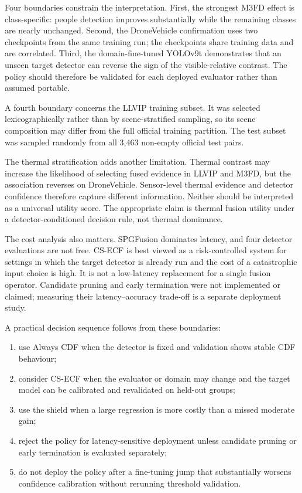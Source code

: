 \documentclass[preprint,11pt]{elsarticle}
\begin{document}
Four boundaries constrain the interpretation. First, the strongest M3FD effect
is class-specific: people detection improves substantially while the remaining
classes are nearly unchanged. Second, the DroneVehicle confirmation uses two
checkpoints from the same training run; the checkpoints share training data and
are correlated. Third, the domain-fine-tuned YOLOv9t demonstrates that an
unseen target detector can reverse the sign of the visible-relative contrast.
The policy should therefore be validated for each deployed evaluator rather
than assumed portable.

A fourth boundary concerns the LLVIP training subset. It was selected
lexicographically rather than by scene-stratified sampling, so its scene
composition may differ from the full official training partition. The test
subset was sampled randomly from all 3,463 non-empty official test pairs.

The thermal stratification adds another limitation. Thermal contrast may
increase the likelihood of selecting fused evidence in LLVIP and M3FD, but the
association reverses on DroneVehicle. Sensor-level thermal evidence and
detector confidence therefore capture different information. Neither should be
interpreted as a universal utility score. The appropriate claim is thermal
fusion utility under a detector-conditioned decision rule, not thermal dominance.

The cost analysis also matters. SPGFusion dominates latency, and four detector
evaluations are not free. CS-ECF is best viewed as a risk-controlled system for
settings in which the target detector is already run and the cost of a
catastrophic input choice is high. It is not a low-latency replacement for a
single fusion operator. Candidate pruning and early termination were not
implemented or claimed; measuring their latency--accuracy trade-off is a
separate deployment study.

A practical decision sequence follows from these boundaries:
\begin{enumerate}
  \item use Always CDF when the detector is fixed and validation shows stable
  CDF behaviour;
  \item consider CS-ECF when the evaluator or domain may change and the target
  model can be calibrated and revalidated on held-out groups;
  \item use the shield when a large regression is more costly than a missed
  moderate gain;
  \item reject the policy for latency-sensitive deployment unless candidate
  pruning or early termination is evaluated separately;
  \item do not deploy the policy after a fine-tuning jump that substantially
  worsens confidence calibration without rerunning threshold validation.
\end{enumerate}
\end{document}
